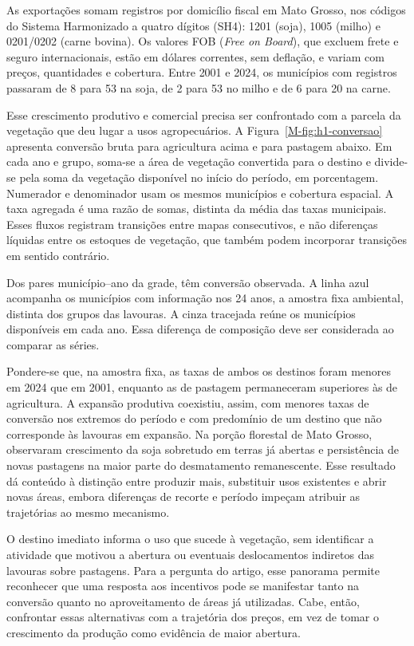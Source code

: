As exportações somam registros por domicílio fiscal em Mato Grosso, nos códigos do Sistema Harmonizado a quatro dígitos (SH4): 1201 (soja), 1005 (milho) e 0201/0202 (carne bovina). Os valores FOB (\textit{Free on Board}), que excluem frete e seguro internacionais, estão em dólares correntes, sem deflação, e variam com preços, quantidades e cobertura. Entre 2001 e 2024, os municípios com registros passaram de 8 para 53 na soja, de 2 para 53 no milho e de 6 para 20 na carne.


\FloatBarrier

Esse crescimento produtivo e comercial precisa ser confrontado com a parcela da vegetação que deu lugar a usos agropecuários. A Figura~\ref{M-fig:h1-conversao} apresenta conversão bruta para agricultura acima e para pastagem abaixo. Em cada ano e grupo, soma-se a área de vegetação convertida para o destino e divide-se pela soma da vegetação disponível no início do período, em porcentagem. Numerador e denominador usam os mesmos municípios e cobertura espacial. A taxa agregada é uma razão de somas, distinta da média das taxas municipais. Esses fluxos registram transições entre mapas consecutivos, e não diferenças líquidas entre os estoques de vegetação, que também podem incorporar transições em sentido contrário.

Dos \Hobs{} pares município--ano da grade, \Hvalid{} têm conversão observada. A linha azul acompanha os \Hfixed{} municípios com informação nos 24 anos, a amostra fixa ambiental, distinta dos grupos das lavouras. A cinza tracejada reúne os municípios disponíveis em cada ano. Essa diferença de composição deve ser considerada ao comparar as séries.



Pondere-se que, na amostra fixa, as taxas de ambos os destinos foram menores em 2024 que em 2001, enquanto as de pastagem permaneceram superiores às de agricultura. A expansão produtiva coexistiu, assim, com menores taxas de conversão nos extremos do período e com predomínio de um destino que não corresponde às lavouras em expansão. Na porção florestal de Mato Grosso,  observaram crescimento da soja sobretudo em terras já abertas e persistência de novas pastagens na maior parte do desmatamento remanescente. Esse resultado dá conteúdo à distinção entre produzir mais, substituir usos existentes e abrir novas áreas, embora diferenças de recorte e período impeçam atribuir as trajetórias ao mesmo mecanismo.

O destino imediato informa o uso que sucede à vegetação, sem identificar a atividade que motivou a abertura ou eventuais deslocamentos indiretos das lavouras sobre pastagens. Para a pergunta do artigo, esse panorama permite reconhecer que uma resposta aos incentivos pode se manifestar tanto na conversão quanto no aproveitamento de áreas já utilizadas. Cabe, então, confrontar essas alternativas com a trajetória dos preços, em vez de tomar o crescimento da produção como evidência de maior abertura.

